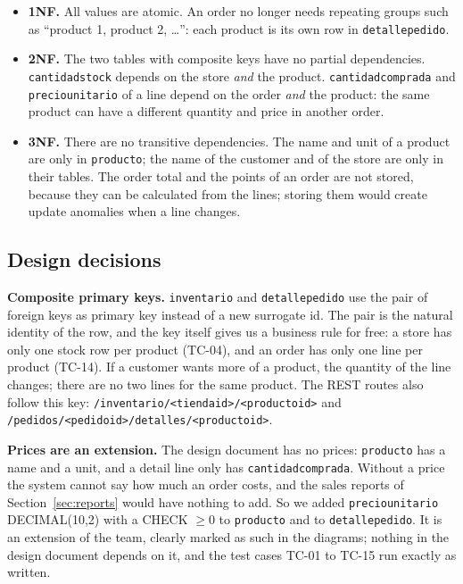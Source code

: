 \documentclass[11pt]{article}
\renewcommand{\_}{\oldus\allowbreak}
\begin{document}
\begin{itemize}[itemsep=0.2em]
  \item \textbf{1NF.} All values are atomic. An order no longer needs repeating groups such as
  ``product 1, product 2, \ldots'': each product is its own row in \texttt{detalle\_pedido}.
  \item \textbf{2NF.} The two tables with composite keys have no partial dependencies.
  \texttt{cantidad\_stock} depends on the store \emph{and} the product. \texttt{cantidad\_comprada} and
  \texttt{precio\_unitario} of a line depend on the order \emph{and} the product: the same product
  can have a different quantity and price in another order.
  \item \textbf{3NF.} There are no transitive dependencies. The name and unit of a product are only
  in \texttt{producto}; the name of the customer and of the store are only in their tables. The
  order total and the points of an order are not stored, because they can be calculated from the
  lines; storing them would create update anomalies when a line changes.
\end{itemize}

\subsection{Design decisions}

\textbf{Composite primary keys.} \texttt{inventario} and \texttt{detalle\_pedido} use the pair of
foreign keys as primary key instead of a new surrogate id. The pair is the natural identity of the
row, and the key itself gives us a business rule for free: a store has only one stock row per
product (TC-04), and an order has only one line per product (TC-14). If a customer wants more of a
product, the quantity of the line changes; there are no two lines for the same product. The REST
routes also follow this key: \texttt{/inventario/<tienda\_id>/<producto\_id>} and
\texttt{/pedidos/<pedido\_id>/detalles/<producto\_id>}.

\textbf{Prices are an extension.}\label{sec:price} The design document has no prices:
\texttt{producto} has a name and a unit, and a detail line only has \texttt{cantidad\_comprada}.
Without a price the system cannot say how much an order costs, and the sales reports of
Section~\ref{sec:reports} would have nothing to add. So we added \texttt{precio\_unitario}
DECIMAL(10,2) with a CHECK $\geq 0$ to \texttt{producto} and to \texttt{detalle\_pedido}. It is an
extension of the team, clearly marked as such in the diagrams; nothing in the design document depends
on it, and the test cases TC-01 to TC-15 run exactly as written.
\end{document}
